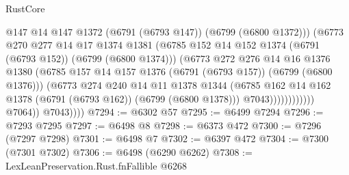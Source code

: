 \begin{lexlean}{RustCore}
\begin{coremodule}
                                    @147
                                    @14
                                    @147
                                    @1372
                                    (@6791 (@6793 @147))
                                    (@6799 (@6800 @1372)))
                                  (@6773
                                    @270
                                    @277
                                    @14
                                    @17
                                    @1374
                                    @1381
                                    (@6785
                                      @152
                                      @14
                                      @152
                                      @1374
                                      (@6791 (@6793 @152))
                                      (@6799 (@6800 @1374)))
                                    (@6773
                                      @272
                                      @276
                                      @14
                                      @16
                                      @1376
                                      @1380
                                      (@6785
                                        @157
                                        @14
                                        @157
                                        @1376
                                        (@6791 (@6793 @157))
                                        (@6799 (@6800 @1376)))
                                      (@6773
                                        @274
                                        @240
                                        @14
                                        @11
                                        @1378
                                        @1344
                                        (@6785
                                          @162
                                          @14
                                          @162
                                          @1378
                                          (@6791 (@6793 @162))
                                          (@6799 (@6800 @1378)))
                                        @7043))))))))))))
                @7064))
            @7043))))
@7294 := @6302 @57
@7295 := @6499 @7294
@7296 := @7293 @7295
@7297 := @6498 @8
@7298 := @6373 @472
@7300 := @7296 (@7297 @7298)
@7301 := @6498 @7
@7302 := @6397 @472
@7304 := @7300 (@7301 @7302)
@7306 := @6498 (@6290 @6262)
@7308 := LexLeanPreservation.Rust.fnFallible @6268

\end{coremodule}
\end{lexlean}
